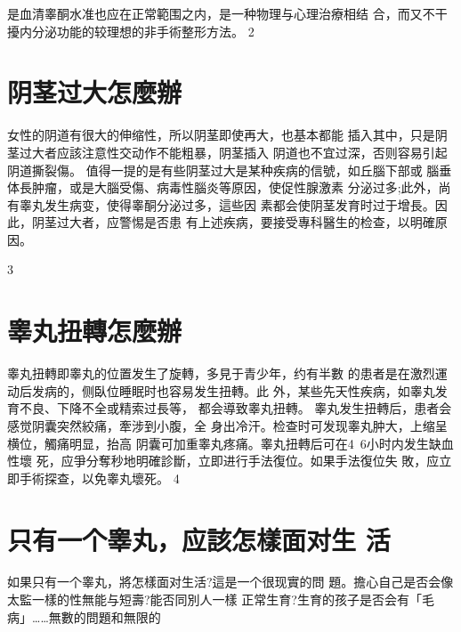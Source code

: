 \documentclass[12pt,UTF8]{ctexbook}
\begin{document}
是血清睾酮水准也应在正常範围之内，是一种物理与心理治療相结
合，而又不干擾内分泌功能的较理想的非手術整形方法。
2
\section{阴茎过大怎麼辦}
女性的阴道有很大的伸缩性，所以阴茎即使再大，也基本都能
插入其中，只是阴茎过大者应該注意性交动作不能粗暴，阴茎插入
阴道也不宜过深，否则容易引起阴道撕裂傷。
值得一提的是有些阴茎过大是某种疾病的信號，如丘腦下部或
腦垂体長肿瘤，或是大腦受傷、病毒性腦炎等原因，使促性腺激素
分泌过多;此外，尚有睾丸发生病变，使得睾酮分泌过多，這些因
素都会使阴茎发育时过于增長。因此，阴茎过大者，应警惕是否患
有上述疾病，要接受專科醫生的检查，以明確原因。

3
\section{睾丸扭轉怎麼辦}
睾丸扭轉即睾丸的位置发生了旋轉，多見于青少年，约有半數
的患者是在激烈運动后发病的，侧臥位睡眠时也容易发生扭轉。此
外，某些先天性疾病，如睾丸发育不良、下降不全或精索过長等，
都会導致睾丸扭轉。
睾丸发生扭轉后，患者会感觉阴囊突然絞痛，牽涉到小腹，全
身出冷汗。检查时可发现睾丸肿大，上缩呈横位，觸痛明显，抬高
阴囊可加重睾丸疼痛。睾丸扭轉后可在4~6小时内发生缺血性壞
死，应爭分奪秒地明確診斷，立即进行手法復位。如果手法復位失
敗，应立即手術探查，以免睾丸壞死。
4
\section{只有一个睾丸，应該怎樣面对生
活}
如果只有一个睾丸，將怎樣面对生活?這是一个很现實的問
題。擔心自己是否会像太監一樣的性無能与短壽?能否同別人一樣
正常生育?生育的孩子是否会有「毛病」……無數的問題和無限的
\end{document}
